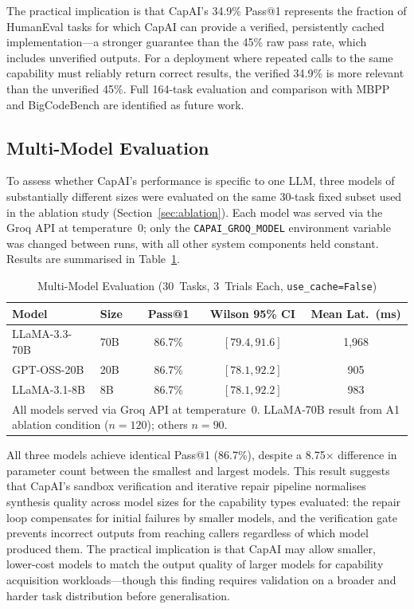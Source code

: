 \documentclass[conference]{IEEEtran}
\begin{document}
The practical implication is that CapAI's 34.9\% Pass@1 represents the
fraction of HumanEval tasks for which CapAI can provide a verified,
persistently cached implementation---a stronger guarantee than the
45\% raw pass rate, which includes unverified outputs.
For a deployment where repeated calls to the same capability must
reliably return correct results, the verified 34.9\% is more relevant
than the unverified 45\%.
Full 164-task evaluation and comparison with MBPP and BigCodeBench are
identified as future work.

\subsection{Multi-Model Evaluation}
\label{subsec:multimodel}

To assess whether CapAI's performance is specific to one LLM, three
models of substantially different sizes were evaluated on the same
30-task fixed subset used in the ablation study
(Section~\ref{sec:ablation}).
Each model was served via the Groq API at temperature~0; only the
\texttt{CAPAI\_GROQ\_MODEL} environment variable was changed between
runs, with all other system components held constant.
Results are summarised in Table~\ref{tab:multimodel}.

\begin{table}[htbp]
  \centering
  \caption{Multi-Model Evaluation (30~Tasks, 3~Trials Each,
           \texttt{use\_cache=False})}
  \label{tab:multimodel}
  \renewcommand{\arraystretch}{1.2}
  \begin{tabular}{llccc}
    \toprule
    \textbf{Model} & \textbf{Size} & \textbf{Pass@1}
      & \textbf{Wilson 95\% CI} & \textbf{Mean Lat.\ (ms)} \\
    \midrule
    LLaMA-3.3-70B & 70B & 86.7\% & $[79.4, 91.6]$ & 1{,}968 \\
    GPT-OSS-20B   & 20B & 86.7\% & $[78.1, 92.2]$ & 905 \\
    LLaMA-3.1-8B  & 8B  & 86.7\% & $[78.1, 92.2]$ & 983 \\
    \bottomrule
    \multicolumn{5}{l}{\parbox{\linewidth}{\footnotesize
      All models served via Groq API at temperature~0.
      LLaMA-70B result from A1 ablation condition ($n=120$); others $n=90$.}}
  \end{tabular}
\end{table}

All three models achieve identical Pass@1 (86.7\%), despite a 8.75$\times$
difference in parameter count between the smallest and largest models.
This result suggests that CapAI's sandbox verification and iterative
repair pipeline normalises synthesis quality across model sizes for the
capability types evaluated: the repair loop compensates for initial
failures by smaller models, and the verification gate prevents incorrect
outputs from reaching callers regardless of which model produced them.
The practical implication is that CapAI may allow smaller, lower-cost
models to match the output quality of larger models for capability
acquisition workloads---though this finding requires validation on a
broader and harder task distribution before generalisation.
\end{document}
